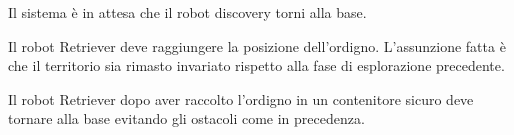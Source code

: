 \begin{description}[itemsep=1em]

  \item[\requirementref{R-waitForHome}]

  Il sistema è in attesa che il robot discovery torni alla base.

  \item[\requirementref{R-reachBag}]

  Il robot Retriever deve raggiungere la posizione dell'ordigno.
  L'assunzione fatta è che il territorio sia rimasto invariato rispetto alla fase di esplorazione precedente.

  \item[\requirementref{R-bagAtHome}]

  Il robot Retriever dopo aver raccolto l'ordigno in un contenitore sicuro deve tornare alla base evitando gli ostacoli come in precedenza.

\end{description}
